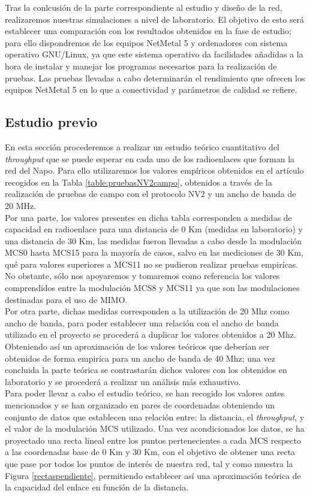 Tras la conlcusión de la parte correspondiente al estudio y diseño de la red, realizaremos nuestras simulaciones a nivel de laboratorio. El objetivo de esto será establecer una comparación con los resultados obtenidos en la fase de estudio; para ello dispondremos de los equipos NetMetal 5 y ordenadores con sistema operativo GNU/Linux, ya que este sistema operativo da facilidades añadidas a la hora de instalar y manejar los programas necesarios para la realización de pruebas. Las pruebas llevadas a cabo determinarán el rendimiento que ofrecen los equipos NetMetal 5 en lo que a conectividad y parámetros de calidad se refiere.

\subsection{Estudio previo} 
	En esta sección procederemos a realizar un estudio teórico cuantitativo del \textit{throughput} que se puede esperar en cada uno de los radioenlaces que forman la red del Napo. Para ello utilizaremos los valores empíricos obtenidos en el artículo \cite{simo2014assessing} recogidos en la Tabla \ref{table:pruebasNV2campo}, obtenidos a través de la realización de pruebas de campo con el protocolo NV2 y un ancho de banda de 20 MHz.\\
	
	Por una parte, los valores presentes en dicha tabla corresponden a medidas de capacidad en radioenlace para una distancia de 0 Km (medidas en laboratorio) y una distancia de 30 Km, las medidas fueron llevadas a cabo desde la modulación MCS0 hasta MCS15 para la mayoría de casos, salvo en las mediciones de 30 Km, qué para valores superiores a MCS11 no se pudieron realizar pruebas empirícas. No obstante, sólo nos apoyaremos y tomaremos como referencia los valores comprendidos entre la modulación MCS8 y MCS11 ya que son las modulaciones destinadas para el uso de MIMO. \\
	Por otra parte, dichas medidas corresponden a la utilización de 20 Mhz como ancho de banda, para poder establecer una relación con el ancho de banda utilizado en el proyecto se procederá a duplicar los valores obtenidos a 20 Mhz. Obteniendo así un aproximación de los valores teóricos que deberían ser obtenidos de forma empiríca para un ancho de banda de 40 Mhz; una vez concluida la parte teórica se contrastarán dichos valores con los obtenidos en laboratorio y se procederá a realizar un análisis más exhaustivo.\\
	
	Para poder llevar a cabo el estudio teórico, se han recogido los valores antes mencionados y se han organizado en pares de coordenadas obteniendo un conjunto de datos que establecen una relación entre: la distancia, el \textit{throughput}, y el valor de la modulación MCS utilizado. Una vez acondicionados los datos, se ha proyectado una recta lineal entre los puntos pertenecientes a cada MCS respecto a las coordenadas base de 0 Km y 30 Km, con el objetivo de obtener una recta que pase por todos los puntos de interés de nuestra red, tal y como muestra la Figura \ref{rectaspendiente}, permitiendo establecer así una aproximación teórica de la capacidad del enlace en función de la distancia.\\
	
